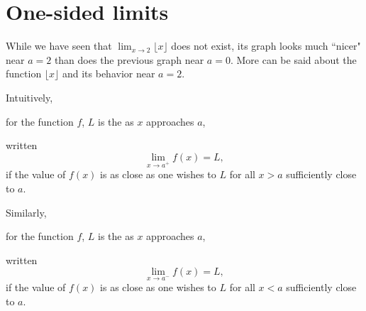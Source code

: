 \documentclass{ximera}
\begin{document}
\section{One-sided limits}


While we have seen that $\lim_{x\to 2}\lfloor x\rfloor$ does not
exist, its graph looks much ``nicer" near $a=2$ than does the previous graph near $a=0$. More can be said about the function $\lfloor x\rfloor$ and its behavior near $a=2$.



\begin{definition}
  Intuitively,

   for the function $f$,  $L$ is the  as $x$ approaches $a$,

  written
  \[
  \lim_{x\to a^+} f(x) = L,
  \]
  if the value of $f(x)$ is as close as one wishes to $L$ for
  all $x>a$ sufficiently close to $a$.
  
  Similarly,


   for  the function $f$, $L$ is the  as $x$ approaches $a$,
  

  written
  \[
  \lim_{x\to a^-} f(x) = L,
  \]
  if the value of $f(x)$ is as close as one wishes to $L$ for
  all $x<a$ sufficiently close to $a$.

\end{definition}
\end{document}

